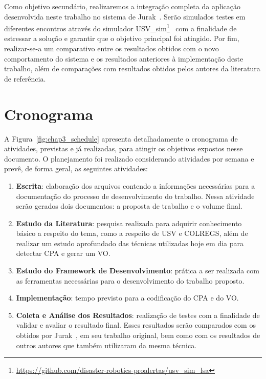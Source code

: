         Como objetivo secundário, realizaremos a integração completa da aplicação desenvolvida neste trabalho no sistema de Jurak~\cite{JURAK2020}. Serão simulados testes em diferentes encontros através do simulador USV\_sim\footnote{\url{https://github.com/disaster-robotics-proalertas/usv\_sim\_lsa}}~\cite{Paravisi2018Toward} com a finalidade de estressar a solução e garantir que o objetivo principal foi atingido. Por fim, realizar-se-a um comparativo entre os resultados obtidos com o novo comportamento do sistema e os resultados anteriores à implementação deste trabalho, além de comparações com resultados obtidos pelos autores da literatura de referência.
        
    \section{Cronograma}
        A Figura~\ref{fig:chap3_schedule} apresenta detalhadamente o cronograma de atividades, previstas e já realizadas, para atingir os objetivos expostos nesse documento. O planejamento foi realizado considerando atividades por semana e prevê, de forma geral, as seguintes atividades:
        \begin{enumerate}
            \item \textbf{Escrita}: elaboração dos arquivos contendo a informações necessárias para a documentação do processo de desenvolvimento do trabalho. Nessa atividade serão gerados dois documentos: a proposta de trabalho e o volume final.
            
            \item \textbf{Estudo da Literatura}: pesquisa realizada para adquirir conhecimento básico a respeito do tema, como a respeito de USV e COLREGS, além de realizar um estudo aprofundado das técnicas utilizadas hoje em dia para detectar CPA e gerar um VO.
            
            \item \textbf{Estudo do Framework de Desenvolvimento}: prática a ser realizada com as ferramentas necessárias para o desenvolvimento do trabalho proposto.
            
            \item \textbf{Implementação}: tempo previsto para a codificação do CPA e do VO.
            
            \item \textbf{Coleta e Análise dos Resultados}: realização de testes com a finalidade de validar e avaliar o resultado final. Esses resultados serão comparados com os obtidos por Jurak~\cite{JURAK2020}, em seu trabalho original, bem como com os resultados de outros autores que também utilizaram da mesma técnica.
        \end{enumerate}
        

